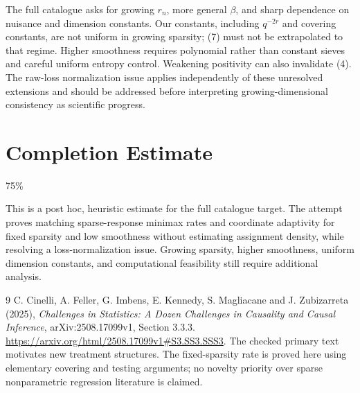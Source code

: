 \documentclass[11pt,a4paper]{article}
\begin{document}
The full catalogue asks for growing $r_n$, more general $\beta$, and sharp dependence on nuisance and dimension constants. Our constants, including $q^{-2r}$ and covering constants, are not uniform in growing sparsity; (7) must not be extrapolated to that regime. Higher smoothness requires polynomial rather than constant sieves and careful uniform entropy control. Weakening positivity can also invalidate (4). The raw-loss normalization issue applies independently of these unresolved extensions and should be addressed before interpreting growing-dimensional consistency as scientific progress.

\section{Completion Estimate}
75\%

This is a post hoc, heuristic estimate for the full catalogue target.
The attempt proves matching sparse-response minimax rates and coordinate adaptivity for fixed sparsity and low smoothness without estimating assignment density, while resolving a loss-normalization issue. Growing sparsity, higher smoothness, uniform dimension constants, and computational feasibility still require additional analysis.

\begin{thebibliography}{9}
 C. Cinelli, A. Feller, G. Imbens, E. Kennedy, S. Magliacane and J. Zubizarreta (2025), \emph{Challenges in Statistics: A Dozen Challenges in Causality and Causal Inference}, arXiv:2508.17099v1, Section 3.3.3. \url{https://arxiv.org/html/2508.17099v1#S3.SS3.SSS3}. The checked primary text motivates new treatment structures. The fixed-sparsity rate is proved here using elementary covering and testing arguments; no novelty priority over sparse nonparametric regression literature is claimed.
\end{thebibliography}
\end{document}
